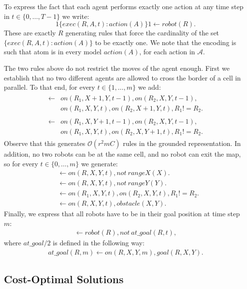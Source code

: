 To express the fact that each agent performs exactly one action at any time step in $t\in\{0,\ldots, T-1\}$ we write:
\begin{equation}
  1 \{exec(R,A,t) : action(A)\} 1 \leftarrow robot(R).
\end{equation}
These are exactly $R$ generating rules that force the cardinality of the set $\{exec(R,A,t) : action(A)\}$ to be exactly one. We note that the encoding is such that atom is in every model $action(A)$, for each action in $\mathcal{A}$.

The two rules above do not restrict the moves of the agent enough. First we establish that no two different agents are allowed to cross the border of a cell in parallel. To that end, for every $t\in\{1,\ldots,m\}$ we add:
\begin{gather}
  \begin{split}
\leftarrow &on(R_1,X+1,Y,t-1), on(R_2,X,Y,t-1), \\ &on(R_1,X,Y,t), on(R_2,X+1,Y,t),R_1!=R_2.
\end{split}\\
\begin{split}
\leftarrow &on(R_1,X,Y+1,t-1), on(R_2,X,Y,t-1),\\ &on(R_1,X,Y,t), on(R_2,X,Y+1,t),R_1!=R_2.
\end{split}
\end{gather}
Observe that this generates $\mathcal{O}(r^2mC)$ rules in the grounded representation. In addition, no two robots can be at the same cell, and no robot can exit the map, so for every $t\in \{0,\ldots,m\}$ we generate:
\begin{align}
&\leftarrow on(R,X,Y,t), not\: rangeX(X).\\
&\leftarrow on(R,X,Y,t), not\: rangeY(Y). \\
&\leftarrow on(R_1,X,Y,t),on(R_2,X,Y,t),R_1!=R_2. \\
&\leftarrow on(R,X,Y,t),obstacle(X,Y).
\end{align}
Finally, we express that all robots have to be in their goal position at time step $m$:
\begin{align}
  \leftarrow robot(R), not\: at\_goal(R,t),
\end{align}
where $at\_goal/2$ is defined in the following way:
\begin{align}
at\_goal(R,m) \leftarrow on(R,X,Y,m), goal(R,X,Y).
\end{align}
\subsection{Cost-Optimal Solutions}
